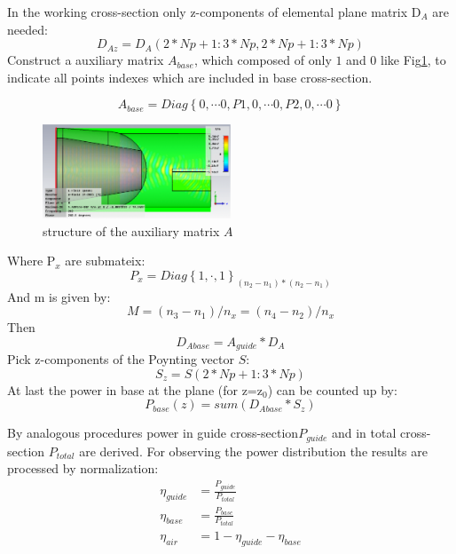 In the working cross-section only z-components of elemental plane matrix D$_{A}$ are needed:
\begin{equation}
D_{Az}=D_{A}(2*Np+1:3*Np, 2*Np+1:3*Np)
\label{Aeq:daz_matrix}
\end{equation}
Construct a auxiliary matrix $A_{base}$, which composed of only $1$ and $0$ like Fig\quad\ref{Afig:app_Auxiliary_matrix}, to indicate all points indexes which are included in base cross-section. 

\begin{equation}
A_{base}=Diag\left\{0,\cdots 0,P1,0,\cdots 0,P2,0,\cdots 0\right\}
\label{Aeq:A_matrix}
\end{equation}

\begin{figure}[ht]
\centering
\includegraphics[width=0.5\textwidth]{bilder/basic_waveguide_efield}
\caption{structure of the auxiliary matrix $A$}
\label{Afig:app_Auxiliary_matrix}
\end{figure}
Where P$_{x}$ are submateix:
\begin{equation}
P_{x}=Diag\left\{1,\cdot,1\right\}_{(n_{2}-n_{1})*(n_{2}-n_{1})}
\end{equation}
And m is given by:
\begin{equation}
M=(n_{3}-n_{1})/n_{x}=(n_{4}-n_{2})/n_{x}
\end{equation}
Then 
\begin{equation}
D_{Abase}=A_{guide}*D_{A}
\end{equation}
Pick z-components of the Poynting vector $S$:
\begin{equation}
S_{z}=S(2*Np+1:3*Np)
\end{equation}
At last the power in base at the plane (for z=z$_{0}$) can be counted up by:
\begin{equation}
P_{base}(z)=sum(D_{Abase}*S_{z})
\end{equation}

By analogous procedures power in guide cross-section$P_{guide}$ and in total cross-section $P_{total}$ are derived. For observing the power distribution the results are processed by normalization:
\begin{align}
\eta_{guide}&=\frac{P_{guide}}{P_{total}}\\
\eta_{base}&=\frac{P_{base}}{P_{total}}\\
\eta_{air}&=1-\eta_{guide}-\eta_{base}
\end{align}

